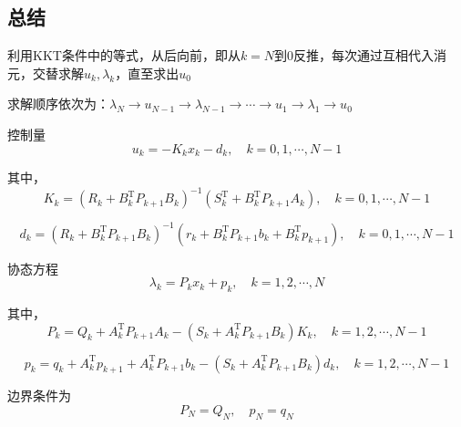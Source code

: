 \documentclass[withoutpreface,bwprint]{NoteBook}
\begin{document}
\subsection{总结}
利用KKT条件中的等式，从后向前，即从$k=N$到$0$反推，每次通过互相代入消元，交替求解$u_k,\lambda_{k}$，直至求出$u_0$​

求解顺序依次为：$\lambda_{N} \rightarrow u_{N-1} \rightarrow \lambda_{N-1} \rightarrow \cdots \rightarrow u_1 \rightarrow \lambda_{1} \rightarrow u_0$

控制量
\begin{equation}
\label{eq:KKT_summary_u_k_normal_type}
u_{k} = -K_k x_{k} -d_k
, \quad k=0,1,\cdots,N-1
\end{equation}

其中，
\begin{equation}
\label{eq:KKT_summary_K_k_detail}
K_{k} = \left( R_{k}+B_{k}^\mathrm{T}P_{k+1} B_{k} \right)^{-1} \left( S_{k}^\mathrm{T} + B_{k}^\mathrm{T} P_{k+1} A_{k} \right) 
, \quad k=0,1,\cdots,N-1
\end{equation}


\begin{equation}
\label{eq:KKT_summary_d_k_detail}
d_{k} = \left( R_{k}+B_{k}^\mathrm{T}P_{k+1} B_{k} \right)^{-1} \left( r_{k}+ B_{k}^\mathrm{T} P_{k+1} b_{k}+B_{k}^\mathrm{T} p_{k+1} \right)
, \quad k=0,1,\cdots,N-1
\end{equation}

协态方程
\begin{equation}
\label{eq:KKT_summary_lambda_k_normal_type}
\lambda_{k} = P_k x_{k} +p_k
,\quad k=1,2,\cdots,N
\end{equation}

其中，
\begin{equation}
\label{eq:KKT_summary_P_k_detail}
P_{k} = Q_{k} +  A_{k}^\mathrm{T}P_{k+1} A_{k} - \left( S_{k}+ A_{k}^\mathrm{T}P_{k+1} B_{k} \right)K_{k} 
,\quad k=1,2,\cdots,N-1
\end{equation}

\begin{equation}
\label{eq:KKT_summary_p_k_detail}
p_{k} = q_{k}+A_{k}^\mathrm{T}p_{k+1} + A_{k}^\mathrm{T}P_{k+1} b_{k}
- \left(S_{k}+ A_{k}^\mathrm{T}P_{k+1} B_{k}  \right) d_{k} 
,\quad k=1,2,\cdots,N-1
\end{equation}

边界条件为
\begin{equation}
\label{eq:KKT_summary_P_N_and_p_N}
P_N = Q_N,\quad p_N=q_N
\end{equation}
\end{document}
